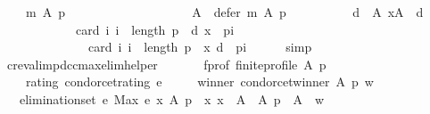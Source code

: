 \begin{isabellebody}
\isanewline
\ \ \ \ {\isachardoublequoteopen}m\ A\ p\ {\isacharequal}{\kern0pt}\isanewline
\ \ \ \ \ \ \ \ {\isacharparenleft}{\kern0pt}{\isacharbraceleft}{\kern0pt}{\isacharbraceright}{\kern0pt}{\isacharcomma}{\kern0pt}\isanewline
\ \ \ \ \ \ \ \ \ \ A\ {\isacharminus}{\kern0pt}\ defer\ m\ A\ p{\isacharcomma}{\kern0pt}\isanewline
\ \ \ \ \ \ \ \ \ \ {\isacharbraceleft}{\kern0pt}d\ {\isasymin}\ A{\isachardot}{\kern0pt}\ {\isasymforall}x{\isasymin}A\ {\isacharminus}{\kern0pt}\ {\isacharbraceleft}{\kern0pt}d{\isacharbraceright}{\kern0pt}{\isachardot}{\kern0pt}\isanewline
\ \ \ \ \ \ \ \ \ \ \ \ card\ {\isacharbraceleft}{\kern0pt}i{\isachardot}{\kern0pt}\ i\ {\isacharless}{\kern0pt}\ length\ p\ {\isasymand}\ {\isacharparenleft}{\kern0pt}d{\isacharcomma}{\kern0pt}\ x{\isacharparenright}{\kern0pt}\ {\isasymin}\ {\isacharparenleft}{\kern0pt}p{\isacharbang}{\kern0pt}i{\isacharparenright}{\kern0pt}{\isacharbraceright}{\kern0pt}\ {\isacharless}{\kern0pt}\isanewline
\ \ \ \ \ \ \ \ \ \ \ \ \ \ card\ {\isacharbraceleft}{\kern0pt}i{\isachardot}{\kern0pt}\ i\ {\isacharless}{\kern0pt}\ length\ p\ {\isasymand}\ {\isacharparenleft}{\kern0pt}x{\isacharcomma}{\kern0pt}\ d{\isacharparenright}{\kern0pt}\ {\isasymin}\ {\isacharparenleft}{\kern0pt}p{\isacharbang}{\kern0pt}i{\isacharparenright}{\kern0pt}{\isacharbraceright}{\kern0pt}{\isacharbraceright}{\kern0pt}{\isacharparenright}{\kern0pt}{\isachardoublequoteclose}\isanewline
\ \ \ \ \isamarkupfalse%
\ simp\isanewline
{}\isamarkupfalse%
%
\endisatagproof
{\isafoldproof}%
%
\isadelimproof
\isanewline
%
\endisadelimproof
\isanewline
{}\isamarkupfalse%
\ cr{\isacharunderscore}{\kern0pt}eval{\isacharunderscore}{\kern0pt}imp{\isacharunderscore}{\kern0pt}dcc{\isacharunderscore}{\kern0pt}max{\isacharunderscore}{\kern0pt}elim{\isacharunderscore}{\kern0pt}helper{}{\isacharcolon}{\kern0pt}\isanewline
\ \ \isanewline
\ \ \ \ f{\isacharunderscore}{\kern0pt}prof{\isacharcolon}{\kern0pt}\ {\isachardoublequoteopen}finite{\isacharunderscore}{\kern0pt}profile\ A\ p{\isachardoublequoteclose}\ \isanewline
\ \ \ \ rating{\isacharcolon}{\kern0pt}\ {\isachardoublequoteopen}condorcet{\isacharunderscore}{\kern0pt}rating\ e{\isachardoublequoteclose}\ \isanewline
\ \ \ \ winner{\isacharcolon}{\kern0pt}\ {\isachardoublequoteopen}condorcet{\isacharunderscore}{\kern0pt}winner\ A\ p\ w{\isachardoublequoteclose}\isanewline
\ \ \ {\isachardoublequoteopen}elimination{\isacharunderscore}{\kern0pt}set\ e\ {\isacharparenleft}{\kern0pt}Max\ {\isacharbraceleft}{\kern0pt}e\ x\ A\ p\ {\isacharbar}{\kern0pt}\ x{\isachardot}{\kern0pt}\ x\ {\isasymin}\ A{\isacharbraceright}{\kern0pt}{\isacharparenright}{\kern0pt}\ {\isacharparenleft}{\kern0pt}{\isacharless}{\kern0pt}{\isacharparenright}{\kern0pt}\ A\ p\ {\isacharequal}{\kern0pt}\ A\ {\isacharminus}{\kern0pt}\ {\isacharbraceleft}{\kern0pt}w{\isacharbraceright}{\kern0pt}{\isachardoublequoteclose}\isanewline

\end{isabellebody}
